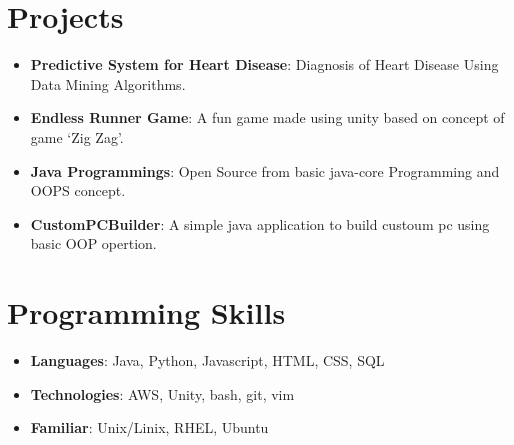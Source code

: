 \documentclass[letterpaper,11pt]{article}
\makeatletter
\newcommand{\resumeItem}[2]{
  \item\small{
    \textbf{#1}{: #2 \vspace{-2pt}}
  }
}
\newcommand{\resumeSubheading}[4]{
  \vspace{-1pt}\item
    \begin{tabular*}{0.97\textwidth}[t]{l@{\extracolsep{\fill}}r}
      \textbf{#1} & #2 \\
      \textit{\small#3} & \textit{\small #4} \\
    \end{tabular*}\vspace{-5pt}
}
\newcommand{\resumeSubItem}[2]{\resumeItem{#1}{#2}\vspace{-4pt}}
\newcommand{\resumeSubHeadingListStart}{\begin{itemize}[leftmargin=*]}
\newcommand{\resumeSubHeadingListEnd}{\end{itemize}}
\newcommand{\resumeItemListStart}{\begin{itemize}}
\newcommand{\resumeItemListEnd}{\end{itemize}\vspace{-5pt}}
\makeatother
\begin{document}



\section{Projects}
\resumeSubHeadingListStart
\resumeSubItem{Predictive System for Heart Disease}
{Diagnosis of Heart Disease Using Data Mining Algorithms.}
\resumeSubItem{Endless Runner Game}
{A fun game made using unity based on concept of game ‘Zig Zag’.}
\resumeSubItem{Java Programmings}
{Open Source from basic java-core Programming and OOPS concept.}
\resumeSubItem{CustomPCBuilder}
{A simple java application to build custoum pc using basic OOP opertion.}
\resumeSubHeadingListEnd

%
\section{Programming Skills}
\resumeSubHeadingListStart
\item{
            \textbf{Languages}{: Java, Python, Javascript, HTML, CSS, SQL}
      }
\item{
            \textbf{Technologies}{: AWS, Unity, bash, git, vim}
      }
\item {
            \textbf{Familiar}{: Unix/Linix, RHEL, Ubuntu }
      }
\resumeSubHeadingListEnd




\end{document}
